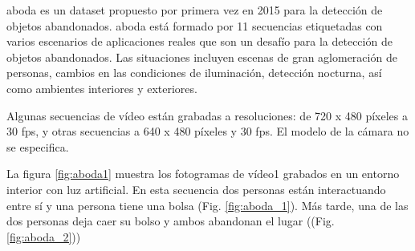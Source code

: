 \gls{aboda} es un dataset propuesto por primera vez en 2015 para la detección de objetos abandonados. \gls{aboda} está formado por 11 secuencias etiquetadas con varios escenarios de aplicaciones reales que son un desafío para la detección de objetos abandonados. Las situaciones incluyen escenas de gran aglomeración de personas, cambios en las condiciones de iluminación, detección nocturna, así como ambientes interiores y exteriores.

Algunas secuencias de vídeo están grabadas a resoluciones: de 720 x 480 píxeles a 30 \gls{fps}, y otras secuencias a 640 x 480 píxeles y 30 \gls{fps}. El modelo de la cámara no se especifica.

La figura \ref{fig:aboda1} muestra los fotogramas de vídeo1 grabados en un entorno interior con luz artificial. En esta secuencia dos personas están interactuando entre sí y una persona tiene una bolsa (Fig. \ref{fig:aboda_1}). Más tarde, una de las dos personas deja caer su bolso y ambos abandonan el lugar ((Fig. \ref{fig:aboda_2}))

